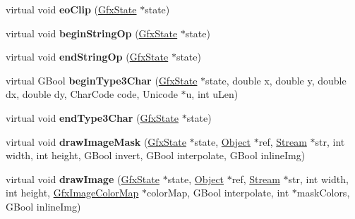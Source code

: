 \begin{DoxyCompactItemize}
\item 
\mbox{\label{class_pre_scan_output_dev_acbcae9288d25b9f7f679fd9afac0e5d7}} 
virtual void {\bfseries eo\+Clip} (\hyperlink{class_gfx_state}{Gfx\+State} $\ast$state)
\item 
\mbox{\label{class_pre_scan_output_dev_a72a996000001c0133b94e2a259d3f971}} 
virtual void {\bfseries begin\+String\+Op} (\hyperlink{class_gfx_state}{Gfx\+State} $\ast$state)
\item 
\mbox{\label{class_pre_scan_output_dev_aeebbb74fda1ac64cfa733912e5be8e9d}} 
virtual void {\bfseries end\+String\+Op} (\hyperlink{class_gfx_state}{Gfx\+State} $\ast$state)
\item 
\mbox{\label{class_pre_scan_output_dev_a7293f0938986e671b85aad348c1e8335}} 
virtual G\+Bool {\bfseries begin\+Type3\+Char} (\hyperlink{class_gfx_state}{Gfx\+State} $\ast$state, double x, double y, double dx, double dy, Char\+Code code, Unicode $\ast$u, int u\+Len)
\item 
\mbox{\label{class_pre_scan_output_dev_a91900738030f8323264c341e4e77ee66}} 
virtual void {\bfseries end\+Type3\+Char} (\hyperlink{class_gfx_state}{Gfx\+State} $\ast$state)
\item 
\mbox{\label{class_pre_scan_output_dev_aa0d8bd03d0d15367c5f628ed17edc728}} 
virtual void {\bfseries draw\+Image\+Mask} (\hyperlink{class_gfx_state}{Gfx\+State} $\ast$state, \hyperlink{class_object}{Object} $\ast$ref, \hyperlink{class_stream}{Stream} $\ast$str, int width, int height, G\+Bool invert, G\+Bool interpolate, G\+Bool inline\+Img)
\item 
\mbox{\label{class_pre_scan_output_dev_a8a6dd23b091799d191edad9adcefd79f}} 
virtual void {\bfseries draw\+Image} (\hyperlink{class_gfx_state}{Gfx\+State} $\ast$state, \hyperlink{class_object}{Object} $\ast$ref, \hyperlink{class_stream}{Stream} $\ast$str, int width, int height, \hyperlink{class_gfx_image_color_map}{Gfx\+Image\+Color\+Map} $\ast$color\+Map, G\+Bool interpolate, int $\ast$mask\+Colors, G\+Bool inline\+Img)
\item 
\mbox{\label{class_pre_scan_output_dev_ae72130b7e661bbf786076c012af6ec78}} 

\end{DoxyCompactItemize}
